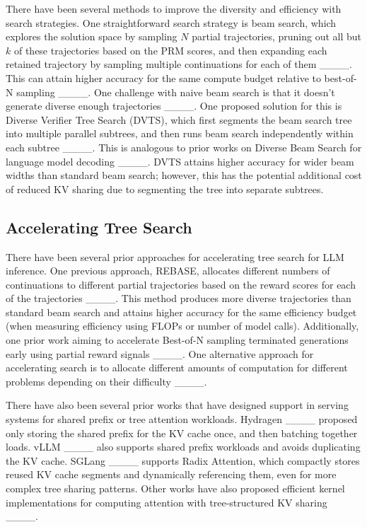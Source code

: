 There have been several methods to improve the diversity and efficiency with search strategies.
One straightforward search strategy is beam search, which explores the solution space by sampling $N$ partial trajectories, pruning out all but $k$ of these trajectories based on the PRM scores, and then expanding each retained trajectory by sampling multiple continuations for each of them ____.
This can attain higher accuracy for the same compute budget relative to best-of-N sampling ____.
One challenge with naive beam search is that it doesn't generate diverse enough trajectories ____.
One proposed solution for this is Diverse Verifier Tree Search (DVTS), which first segments the beam search tree into multiple parallel subtrees, and then runs beam search independently within each subtree ____.
This is analogous to prior works on Diverse Beam Search for language model decoding ____.
DVTS attains higher accuracy for wider beam widths than standard beam search; however, this has the potential additional cost of reduced KV sharing due to segmenting the tree into separate subtrees.

\subsection{Accelerating Tree Search}

There have been several prior approaches for accelerating tree search for LLM inference. 
One previous approach, REBASE, allocates different numbers of continuations to different partial trajectories based on the reward scores for each of the trajectories ____.
This method produces more diverse trajectories than standard beam search and attains higher accuracy for the same efficiency budget (when measuring efficiency using FLOPs or number of model calls).
Additionally, one prior work aiming to accelerate Best-of-N sampling terminated generations early using partial reward signals ____.
One alternative approach for accelerating search is to allocate different amounts of computation for different problems depending on their difficulty ____.

There have also been several prior works that have designed support in serving systems for shared prefix or tree attention workloads.
Hydragen ____ proposed only storing the shared prefix for the KV cache once, and then batching together loads.
vLLM ____ also supports shared prefix workloads and avoids duplicating the KV cache.
SGLang ____ supports Radix Attention, which compactly stores reused KV cache segments and dynamically referencing them, even for more complex tree sharing patterns.
Other works have also proposed efficient kernel implementations for computing attention with tree-structured KV sharing ____.